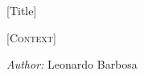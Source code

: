 \begin{titlepage}
	\thispagestyle{styletitlepage}
	\begin{addmargin}[4cm]{0cm}
		\vspace*{9em}
		\begin{flushright}
		{\Huge
			[Title]\par
			[Subtitle]\par}
		\vspace{6\baselineskip}
		{\Large\textsc{[Context]}\par}
		\vfill
		{\large\emph{Author:} Leonardo Barbosa}
		\end{flushright}
	\end{addmargin}
	\fancyfoot[LE,RO]{\thepage}
\end{titlepage}

